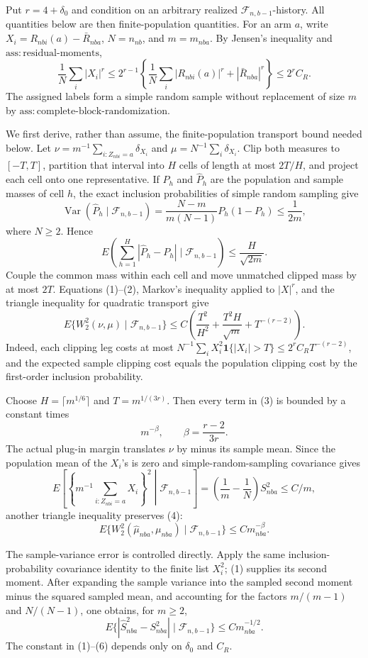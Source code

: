 Put \(r=4+\delta_0\) and condition on an arbitrary realized \(\mathcal F_{n,b-1}\)-history.  All quantities below are then finite-population quantities.  For an arm \(a\), write \(X_i=R_{nbi}(a)-\bar R_{nba}\), \(N=n_{nb}\), and \(m=m_{nba}\).  By Jensen's inequality and \(\mathrm{ass:residual\text{-}moments}\),
\[
 \frac1N\sum_i|X_i|^r
 \le 2^{r-1}\left\{\frac1N\sum_i|R_{nbi}(a)|^r+|\bar R_{nba}|^r\right\}
 \le 2^r C_R. \tag{1}
\]
The assigned labels form a simple random sample without replacement of size \(m\) by \(\mathrm{ass:complete\text{-}block\text{-}randomization}\).

We first derive, rather than assume, the finite-population transport bound needed below.  Let \(\nu=m^{-1}\sum_{i:Z_{nbi}=a}\delta_{X_i}\) and \(\mu=N^{-1}\sum_i\delta_{X_i}\).  Clip both measures to \([-T,T]\), partition that interval into \(H\) cells of length at most \(2T/H\), and project each cell onto one representative.  If \(P_h\) and \(\widehat P_h\) are the population and sample masses of cell \(h\), the exact inclusion probabilities of simple random sampling give
\[
 \operatorname{Var}(\widehat P_h\mid\mathcal F_{n,b-1})
 =\frac{N-m}{m(N-1)}P_h(1-P_h)\le\frac1{2m},
\]
where \(N\ge2\).  Hence
\[
 E\!\left(\sum_{h=1}^H|\widehat P_h-P_h|\mid\mathcal F_{n,b-1}\right)\le \frac{H}{\sqrt{2m}}. \tag{2}
\]
Couple the common mass within each cell and move unmatched clipped mass by at most \(2T\).  Equations (1)--(2), Markov's inequality applied to \(|X|^r\), and the triangle inequality for quadratic transport give
\[
 E\{W_2^2(\nu,\mu)\mid\mathcal F_{n,b-1}\}
 \le C\left(\frac{T^2}{H^2}+\frac{T^2H}{\sqrt m}+T^{-(r-2)}\right). \tag{3}
\]
Indeed, each clipping leg costs at most
\(N^{-1}\sum_iX_i^2\mathbf 1\{|X_i|>T\}\le 2^rC_RT^{-(r-2)}\), and the expected sample clipping cost equals the population clipping cost by the first-order inclusion probability.

Choose \(H=\lceil m^{1/6}\rceil\) and \(T=m^{1/(3r)}\).  Then every term in (3) is bounded by a constant times
\[
 m^{-\beta},\qquad \beta=\frac{r-2}{3r}. \tag{4}
\]
The actual plug-in margin translates \(\nu\) by minus its sample mean.  Since the population mean of the \(X_i\)'s is zero and simple-random-sampling covariance gives
\[
 E\left[\left\{m^{-1}\sum_{i:Z_{nbi}=a}X_i\right\}^2\middle|\mathcal F_{n,b-1}\right]
 =\left(\frac1m-\frac1N\right)S_{nba}^2\le C/m,
\]
another triangle inequality preserves (4):
\[
 E\{W_2^2(\widehat\mu_{nba},\mu_{nba})\mid\mathcal F_{n,b-1}\}\le C m_{nba}^{-\beta}. \tag{5}
\]

The sample-variance error is controlled directly.  Apply the same inclusion-probability covariance identity to the finite list \(X_i^2\); (1) supplies its second moment.  After expanding the sample variance into the sampled second moment minus the squared sampled mean, and accounting for the factors \(m/(m-1)\) and \(N/(N-1)\), one obtains, for \(m\ge2\),
\[
 E\{|\widehat S_{nba}^2-S_{nba}^2|\mid\mathcal F_{n,b-1}\}\le C m_{nba}^{-1/2}. \tag{6}
\]
The constant in (1)--(6) depends only on \(\delta_0\) and \(C_R\).

